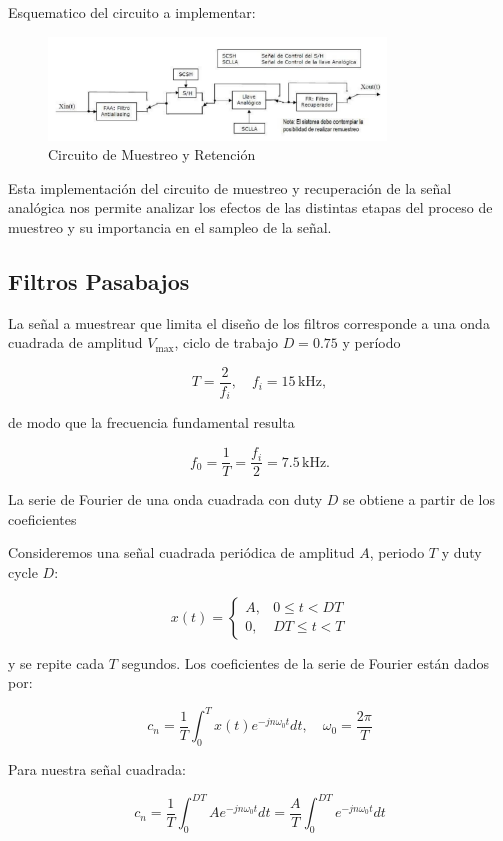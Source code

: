 Esquematico del circuito a implementar:
\begin{figure}[H]
    \centering
    \includegraphics[width=0.8\textwidth]{Imagenes/Circuito_Muestreo.png}
    \caption{Circuito de Muestreo y Retención}
    \label{fig:Circuito_Muestreo}
\end{figure}
Esta implementación del circuito de muestreo y recuperación de la señal analógica nos permite analizar 
los efectos de las distintas etapas del proceso de muestreo y su importancia en el sampleo de la señal.

\subsection{Filtros Pasabajos}

La señal a muestrear que limita el diseño de los filtros corresponde 
a una onda cuadrada de amplitud $V_{\max}$, ciclo de trabajo $D = 0.75$ 
y período

\[
T = \frac{2}{f_i}, \quad f_i = 15 \,\text{kHz},
\]

de modo que la frecuencia fundamental resulta

\[
f_0 = \frac{1}{T} = \frac{f_i}{2} = 7.5 \,\text{kHz}.
\]



La serie de Fourier de una onda cuadrada con duty $D$ se obtiene a partir 
de los coeficientes

Consideremos una señal cuadrada periódica de amplitud $A$, periodo $T$ y duty cycle $D$:

\[
x(t) =
\begin{cases}
A, & 0 \le t < D T \\
0, & D T \le t < T
\end{cases}
\]

y se repite cada $T$ segundos.
Los coeficientes de la serie de Fourier están dados por:

\[
c_n = \frac{1}{T} \int_0^T x(t) e^{-j n \omega_0 t} dt, \quad \omega_0 = \frac{2 \pi}{T}
\]

Para nuestra señal cuadrada:

\[
c_n = \frac{1}{T} \int_0^{D T} A e^{-j n \omega_0 t} dt
= \frac{A}{T} \int_0^{D T} e^{-j n \omega_0 t} dt
\]

